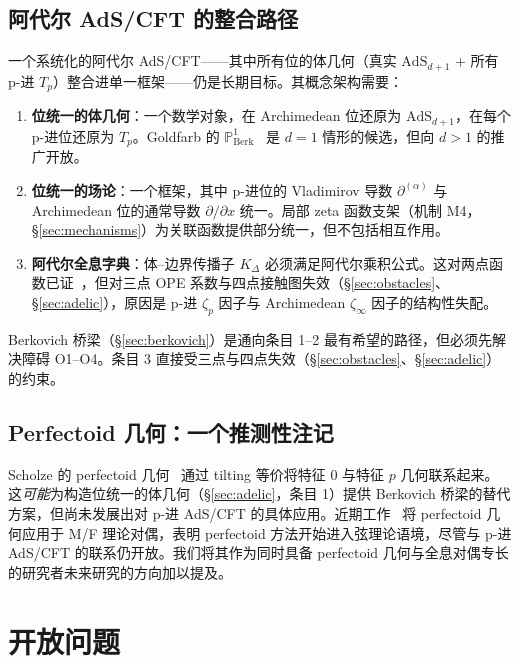 \documentclass[11pt,a4paper]{ctexart}
\theoremstyle{remark}
\newcommand{\PoneBerk}{\mathbb{P}^1_{\mathrm{Berk}}}
\newcommand{\AdS}{\mathrm{AdS}}
\newcommand{\dpartial}{\partial^{(\alpha)}}
\newcommand{\KK}{K_\Delta}
\begin{document}
\subsection{阿代尔 AdS/CFT 的整合路径}

一个系统化的阿代尔 AdS/CFT——其中所有位的体几何（真实 $\AdS_{d+1}$ + 所有 p-进 $T_p$）整合进单一框架——仍是长期目标。其概念架构需要：

\begin{enumerate}[leftmargin=2em]
    \item \textbf{位统一的体几何}：一个数学对象，在 Archimedean 位还原为 $\AdS_{d+1}$，在每个 p-进位还原为 $T_p$。Goldfarb 的 $\PoneBerk$~\cite{G23} 是 $d=1$ 情形的候选，但向 $d > 1$ 的推广开放。
    \item \textbf{位统一的场论}：一个框架，其中 p-进位的 Vladimirov 导数 $\dpartial$ 与 Archimedean 位的通常导数 $\partial/\partial x$ 统一。局部 zeta 函数支架（机制 M4，\S\ref{sec:mechanisms}）为关联函数提供部分统一，但不包括相互作用。
    \item \textbf{阿代尔全息字典}：体--边界传播子 $\KK$ 必须满足阿代尔乘积公式。这对两点函数已证~\cite{HSYZ20}，但对三点 OPE 系数与四点接触图失效（\S\ref{sec:obstacles}、\S\ref{sec:adelic}），原因是 p-进 $\zeta_p$ 因子与 Archimedean $\zeta_\infty$ 因子的结构性失配。
\end{enumerate}

Berkovich 桥梁（\S\ref{sec:berkovich}）是通向条目 1--2 最有希望的路径，但必须先解决障碍 O1--O4。条目 3 直接受三点与四点失效（\S\ref{sec:obstacles}、\S\ref{sec:adelic}）的约束。

\subsection{Perfectoid 几何：一个推测性注记}

Scholze 的 perfectoid 几何~\cite{Sch11} 通过 tilting 等价将特征 0 与特征 $p$ 几何联系起来。这\emph{可能}为构造位统一的体几何（\S\ref{sec:adelic}，条目 1）提供 Berkovich 桥梁的替代方案，但尚未发展出对 p-进 AdS/CFT 的具体应用。近期工作~\cite{SGF26} 将 perfectoid 几何应用于 M/F 理论对偶，表明 perfectoid 方法开始进入弦理论语境，尽管与 p-进 AdS/CFT 的联系仍开放。我们将其作为同时具备 perfectoid 几何与全息对偶专长的研究者未来研究的方向加以提及。

\section{开放问题}
\label{sec:open}
\end{document}
